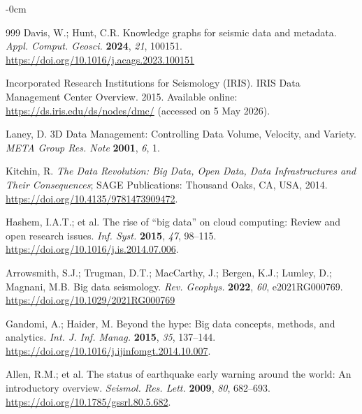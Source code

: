 \documentclass[data,article,accept,pdftex,moreauthors]{Definitions/mdpi}
\begin{document}
\begin{adjustwidth}{-\extralength}{0cm}
\begin{thebibliography}{999}
Davis, W.; Hunt, C.R. Knowledge graphs for seismic data and metadata. \emph{Appl. Comput. Geosci.} \textbf{2024}, \emph{21}, 100151. \url{https://doi.org/10.1016/j.acags.2023.100151}

Incorporated Research Institutions for Seismology (IRIS). IRIS Data Management Center Overview. 2015. Available online: \url{https://ds.iris.edu/ds/nodes/dmc/} (accessed on 5 May 2026).

Laney, D. 3D Data Management: Controlling Data Volume, Velocity, and Variety. \emph{META Group Res. Note} \textbf{2001}, \emph{6}, 1. %

Kitchin, R. \emph{The Data Revolution: Big Data, Open Data, Data Infrastructures and Their Consequences}; SAGE Publications: Thousand Oaks, CA, USA, %
 2014. \url{https://doi.org/10.4135/9781473909472}.

Hashem, I.A.T.; et al. The rise of ``big data'' on cloud computing: Review and open research issues. \emph{Inf. Syst.} \textbf{2015}, \emph{47}, 98--115. \url{https://doi.org/10.1016/j.is.2014.07.006}. %

Arrowsmith, S.J.; Trugman, D.T.; MacCarthy, J.; Bergen, K.J.; Lumley, D.; Magnani, M.B. Big data seismology. \emph{Rev. Geophys.} \textbf{2022}, \emph{60}, e2021RG000769. \url{https://doi.org/10.1029/2021RG000769}

Gandomi, A.; Haider, M. Beyond the hype: Big data concepts, methods, and analytics. \emph{Int. J. Inf. Manag.} \textbf{2015}, \emph{35}, 137--144. \url{https://doi.org/10.1016/j.ijinfomgt.2014.10.007}.

Allen, R.M.; et al. The status of earthquake early warning around the world: An introductory overview. \emph{Seismol. Res. Lett.} \textbf{2009}, \emph{80}, 682--693. \url{https://doi.org/10.1785/gssrl.80.5.682}.


\end{thebibliography}
\end{adjustwidth}
\end{document}
